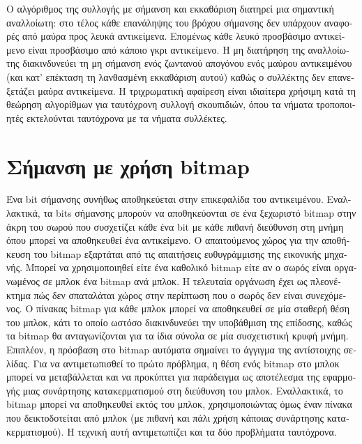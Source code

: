 \begin{greek}
Ο αλγόριθμος της συλλογής με σήμανση και εκκαθάριση διατηρεί
μια σημαντική αναλλοίωτη: στο τέλος κάθε επανάληψης του
βρόχου σήμανσης δεν υπάρχουν αναφορές από μαύρα προς λευκά 
αντικείμενα. Επομένως κάθε λευκό προσβάσιμο αντικείμενο
είναι προσβάσιμο από κάποιο γκρι αντικείμενο. Η μη διατήρηση
της αναλλοίωτης διακινδυνεύει τη μη σήμανση ενός ζωντανού
απογόνου ενός μαύρου αντικειμένου (και κατ' επέκταση τη
λανθασμένη εκκαθάριση αυτού) καθώς ο συλλέκτης δεν 
επανεξετάζει μαύρα αντικείμενα. Η τριχρωματική αφαίρεση
είναι ιδιαίτερα χρήσιμη κατά τη θεώρηση αλγορίθμων για
ταυτόχρονη συλλογή σκουπιδιών, όπου τα νήματα τροποποιητές
εκτελούνται ταυτόχρονα με τα νήματα συλλέκτες.

\section{Σήμανση με χρήση bitmap}
Ένα bit σήμανσης συνήθως αποθηκεύεται στην επικεφαλίδα του
αντικειμένου. Εναλλακτικά, τα bits σήμανσης μπορούν να αποθηκεύονται
σε ένα ξεχωριστό bitmap στην άκρη του σωρού που συσχετίζει
κάθε ένα bit με κάθε πιθανή διεύθυνση στη μνήμη όπου μπορεί
να αποθηκευθεί ένα αντικείμενο. Ο απαιτούμενος χώρος για την
αποθήκευση του bitmap εξαρτάται από τις απαιτήσεις ευθυγράμμισης
της εικονικής μηχανής. Μπορεί να χρησιμοποιηθεί είτε ένα
καθολικό bitmap είτε αν ο σωρός είναι οργανωμένος σε μπλοκ
ένα bitmap ανά μπλοκ. Η τελευταία οργάνωση έχει ως πλεονέκτημα
πώς δεν σπαταλάται χώρος στην περίπτωση που ο σωρός δεν είναι
συνεχόμενος. Ο πίνακας bitmap για κάθε μπλοκ μπορεί να αποθηκευθεί
σε μία σταθερή θέση του μπλοκ, κάτι το οποίο ωστόσο διακινδυνεύει
την υποβάθμιση της επίδοσης, καθώς τα bitmap θα ανταγωνίζονται
για τα ίδια σύνολα σε μία συσχετιστική κρυφή μνήμη. Επιπλέον,
η πρόσβαση στο bitmap αυτόματα σημαίνει το άγγιγμα της αντίστοιχης
σελίδας. Για να αντιμετωπισθεί το πρώτο πρόβλημα, η θέση ενός
bitmap στο μπλοκ μπορεί να μεταβάλλεται και να προκύπτει για
παράδειγμα ως αποτέλεσμα της εφαρμογής μιας συνάρτησης κατακερματισμού
στη διεύθυνση του μπλοκ. Εναλλακτικά, το bitmap μπορεί να αποθηκευθεί
εκτός του μπλοκ, χρησιμοποιώντας όμως έναν πίνακα που δεικτοδοτείται
από μπλοκ (με πιθανή και πάλι χρήση κάποιας συνάρτησης κατακερματισμού).
Η τεχνική αυτή αντιμετωπίζει και τα δύο προβλήματα ταυτόχρονα.


\end{greek}

